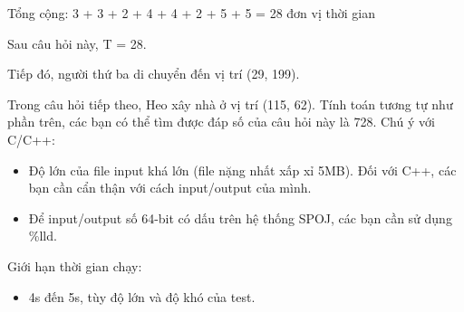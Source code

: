    Tổng cộng: 3 + 3 + 2 + 4 + 4 + 2 + 5 + 5 = 28 đơn vị thời gian  

   Sau câu hỏi này, T = 28.  

   Tiếp đó, người thứ ba di chuyển đến vị trí (29, 199).  

   Trong câu hỏi tiếp theo, Heo xây nhà ở vị trí (115, 62). Tính toán tương tự như phần trên, các bạn có thể tìm được đáp số của câu hỏi này là 728.
   Chú ý với C/C++:  
\begin{itemize}
	\item     Độ lớn của file input khá lớn (file nặng nhất xấp xỉ 5MB). Đối với C++, các bạn cần cẩn thận với cách input/output của mình.   
	\item     Để input/output số 64-bit có dấu trên hệ thống SPOJ, các bạn cần sử dụng \%lld.   
\end{itemize}
   Giới hạn thời gian chạy:  
\begin{itemize}
	\item     4s đến 5s, tùy độ lớn và độ khó của test.   
\end{itemize}